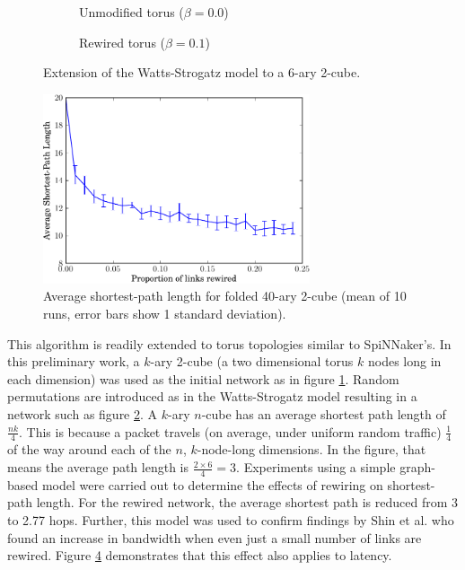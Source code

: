			\begin{figure}
				\center
				\begin{subfigure}[t]{0.45\textwidth}
					\center
					
					\caption{Unmodified torus ($\beta=0.0$)}
					\label{fig:torusNetworkB0}
				\end{subfigure}
				\begin{subfigure}[t]{0.45\textwidth}
					\center
					
					\caption{Rewired torus ($\beta=0.1$)}
					\label{fig:torusNetworkB01}
				\end{subfigure}
				
				\caption{Extension of the Watts-Strogatz model to a 6-ary 2-cube.}
				\label{fig:torusNetwork}
			\end{figure}
			
			\begin{figure}
				\center
				\includegraphics[width=0.7\textwidth]{figures/smallWorldTorus}
				\caption[Average shortest-path length for folded 40-ary 2-cube.]{Average
				shortest-path length for folded 40-ary 2-cube (mean of 10 runs, error
				bars show 1 standard deviation).}
				\label{fig:smallWorldTorus}
			\end{figure}
			
			This algorithm is readily extended to torus topologies similar to
			SpiNNaker's. In this preliminary work, a $k$-ary 2-cube (a two dimensional
			torus $k$ nodes long in each dimension) was used as the initial network as
			in figure \ref{fig:torusNetworkB0}.  Random permutations are introduced as
			in the Watts-Strogatz model resulting in a network such as figure
			\ref{fig:torusNetworkB01}. A $k$-ary $n$-cube has an average shortest path
			length of $\frac{nk}{4}$.  This is because a packet travels (on average,
			under uniform random traffic) $\frac{1}{4}$ of the way around each of the
			$n$, $k$-node-long dimensions. In the figure, that means the average path
			length is $\frac{2 \times 6}{4} = 3$. Experiments using a simple
			graph-based model were carried out to determine the effects of rewiring on
			shortest-path length.  For the rewired network, the average shortest path
			is reduced from 3 to 2.77 hops.  Further, this model was used to confirm
			findings by Shin et al.  \cite{shin11} who found an increase in bandwidth
			when even just a small number of links are rewired. Figure
			\ref{fig:smallWorldTorus} demonstrates that this effect also applies to
			latency.
			

